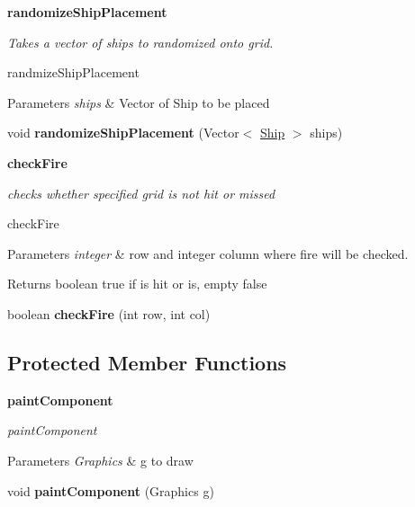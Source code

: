 \begin{Indent}{\bf randomize\+Ship\+Placement}\par
{\em Takes a vector of ships to randomized onto grid.

randmize\+Ship\+Placement


\begin{DoxyParams}{Parameters}
{\em ships} & Vector of Ship to be placed \\
\hline
\end{DoxyParams}
}\begin{DoxyCompactItemize}
\item 
\hypertarget{classbattleship_1_1gameboard_1_1Gameboard_a20f510263c4c5f88fdcb46138c51da01}{}void {\bfseries randomize\+Ship\+Placement} (Vector$<$ \hyperlink{classbattleship_1_1ships_1_1Ship}{Ship} $>$ ships)\label{classbattleship_1_1gameboard_1_1Gameboard_a20f510263c4c5f88fdcb46138c51da01}

\end{DoxyCompactItemize}
\end{Indent}
\begin{Indent}{\bf check\+Fire}\par
{\em checks whether specified grid is not hit or missed

check\+Fire


\begin{DoxyParams}{Parameters}
{\em integer} & row and integer column where fire will be checked. \\
\hline
\end{DoxyParams}
\begin{DoxyReturn}{Returns}
boolean true if is hit or is, empty false 
\end{DoxyReturn}
}\begin{DoxyCompactItemize}
\item 
\hypertarget{classbattleship_1_1gameboard_1_1Gameboard_a19e6465d39ed319f420eb9c6af3d92e3}{}boolean {\bfseries check\+Fire} (int row, int col)\label{classbattleship_1_1gameboard_1_1Gameboard_a19e6465d39ed319f420eb9c6af3d92e3}

\end{DoxyCompactItemize}
\end{Indent}
\subsection*{Protected Member Functions}
\begin{Indent}{\bf paint\+Component}\par
{\em paint\+Component


\begin{DoxyParams}{Parameters}
{\em Graphics} & g to draw \\
\hline
\end{DoxyParams}
}\begin{DoxyCompactItemize}
\item 
\hypertarget{classbattleship_1_1gameboard_1_1Gameboard_adf366958db57dcee1cafe3b894521e82}{}void {\bfseries paint\+Component} (Graphics g)\label{classbattleship_1_1gameboard_1_1Gameboard_adf366958db57dcee1cafe3b894521e82}

\end{DoxyCompactItemize}
\end{Indent}


